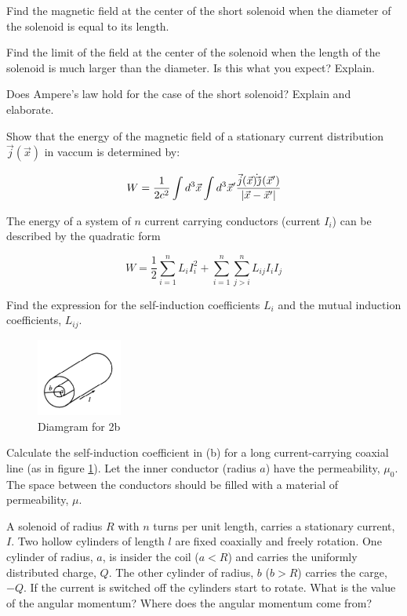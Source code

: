 \documentclass[
  course = {{Electricity and Magnetism 3}},
  term = {{4a Fall 2020}},
  assignment = 1,
  name = {{Andrew Kovachik}},
  studentnumber = {{20673849}},
  email = {{kovachik.andrew@gmail.com ; ajkovach@uwaterloo.ca}},
  firstexercise = 1
]{aga-homework}
\begin{document}
\ssubexercise

Find the magnetic field at the center of the short solenoid when the diameter of the solenoid is
equal to its length.

\ssubexercise

Find the limit of the field at the center of the solenoid when the length of the solenoid is much
larger than the diameter. Is this what you expect? Explain.

\ssubexercise

Does Ampere's law hold for the case of the short solenoid? Explain and elaborate.

\newpage
\subexercise


\ssubexercise

Show that the energy of the magnetic field of a stationary current distribution $\vec{j}(\vec{x})$
in vaccum is determined by:

$$
W = \frac{1}{2c^2} \int d^3\vec{x} \int d^3\vec{x}' \frac{\vec{j}(\vec{x})\dot
\vec{j}(\vec{x}')}{\abs{\vec{x}-\vec{x}'}}
$$


\ssubexercise

The energy of a system of $n$ current carrying conductors (current $I_i$) can be described by the
quadratic form 

$$
W = \frac{1}{2} \sum\limits_{i=1}^n L_i I_i^2 + \sum\limits_{i=1}^n\sum\limits_{j>i}^n L_{ij} I_i
I_j
$$


Find the expression for the self-induction coefficients $L_i$ and the mutual induction coefficients,
$L_{ij}$.

\ssubexercise

\begin{figure}[h]
    \centering
    \includegraphics[width=0.25\textwidth]{cyl}
    \caption{Diamgram for 2b}
    \label{cyl}
\end{figure}

Calculate the self-induction coefficient in (b) for a long current-carrying coaxial line (as in
figure \ref{cyl}). Let the inner conductor (radius $a$) have the permeability, $\mu_0$. The space
between the conductors should be filled with a material of permeability, $\mu$.

\newpage
\subexercise

A solenoid of radius $R$ with $n$ turns per unit length, carries a stationary current, $I$. Two
hollow cylinders of length $l$ are fixed coaxially and freely rotation. One cylinder of radius, $a$,
is insider the coil ($a<R$) and carries the uniformly distributed charge, $Q$. The other cylinder of
radius, $b$ ($b>R$) carries the carge, $-Q$. If the current is switched off the cylinders start to
rotate. What is the value of the angular momentum? Where does the angular momentum come from?
\end{document}
